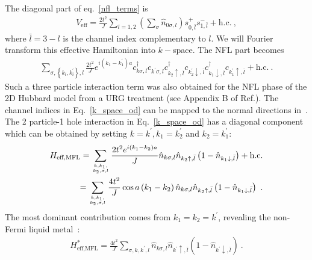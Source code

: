 \documentclass[reprint,prb,superscriptaddress]{revtex4-2}
\begin{document}
The diagonal part of eq.~\ref{nfl_terms} is
\begin{equation}\begin{aligned}
	V_\text{eff} = \frac{2t^2}{J}\sum_{l=1,2}\left(\sum_\sigma \hat n_{0\sigma,l}\right) s^+_{0,\bar l}s^-_{1,\bar l} + \text{h.c.}~,
\end{aligned}\end{equation}
where \(\bar l = 3 - l\) is the channel index complementary to \(l\). We will Fourier transform this effective Hamiltonian into \(k-\)space. The NFL part becomes
\begin{equation}\begin{aligned}
	\label{k_space_od}
	\sum_{\sigma, \left\{k_i,k_i^\prime\right\},l} \frac{2t^2}{J}e^{i\left(k_1 - k_1^\prime\right)a}c^\dagger_{k\sigma,l}c_{k^\prime\sigma,l}c^\dagger_{k_2 \uparrow, \bar l}c_{k_2^\prime \downarrow,\bar l}c^\dagger_{k_1 \downarrow,\bar l}c_{k_1^\prime \uparrow, \bar l} + \text{h.c.} ~.
\end{aligned}\end{equation}
Such a three particle interaction term was also obtained for the NFL phase of the 2D Hubbard model from a URG treatment (see Appendix B of Ref.\cite{anirbanmott1}). The channel indices in Eq.~\ref{k_space_od} can be mapped to the normal directions in~\cite{anirbanmott1}. The 2 particle-1 hole interaction in Eq.~\ref{k_space_od} has a diagonal component which can be obtained by setting \(k=k^\prime, k_1 = k_2^\prime\) and \(k_2 = k_1^\prime\):
\begin{equation}\begin{aligned}
	H_\text{eff,MFL} = \sum_{k, k_1, \atop{k_2,\sigma,  l}} \frac{2t^2e^{i\left(k_1 - k_2\right)a}}{J} \hat n_{k\sigma,l} \hat n_{k_2 \uparrow, \bar l}\left(1 - \hat n_{k_1 \downarrow,\bar l}\right) + \text{h.c.}\\
	= \sum_{k, k_1, \atop{k_2,\sigma,  l}} \frac{4t^2}{J} \cos a\left(k_1 - k_2\right)  \hat n_{k\sigma,l} \hat n_{k_2 \uparrow, \bar l}\left(1 - \hat n_{k_1 \downarrow,\bar l}\right)~.
\end{aligned}\end{equation}
The most dominant contribution comes from \(k_1 = k_2 = k^\prime\), revealing the non-Fermi liquid metal~\cite{cox_jarrell_two_channel_rev,andrei_jerez_1995}:
\begin{equation}\begin{aligned}
	\label{mfl_large}
	H^*_\text{eff,MFL} = \frac{4t^2}{J} \sum_{\sigma, k, k^\prime, l} \hat n_{k\sigma,l} \hat n_{k^\prime \uparrow, \bar l}\left(1 - \hat n_{k^\prime \downarrow,\bar l}\right)~.
\end{aligned}\end{equation}
\end{document}
